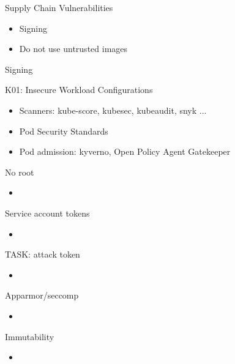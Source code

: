 \documentclass{dcpresentation}
\begin{document}
\begin{frame}{Supply Chain Vulnerabilities}
  \begin{itemize}
  \item Signing
  \item Do not use untrusted images
  \end{itemize}
  Signing

\end{frame}


\begin{frame}{K01: Insecure Workload Configurations}
  \begin{itemize}
  \item Scanners: kube-score, kubesec, kubeaudit, snyk ...
  \item Pod Security Standards
  \item Pod admission: kyverno, Open Policy Agent Gatekeeper
  \end{itemize}
\end{frame}


\begin{frame}{No root}
  \begin{itemize}
    \item 
  \end{itemize}
\end{frame}

\begin{frame}{Service account tokens}
  \begin{itemize}
    \item 
  \end{itemize}
\end{frame}

\begin{frame}{TASK: attack token}
  \begin{itemize}
    \item 
  \end{itemize}
\end{frame}

\begin{frame}{Apparmor/seccomp}
  \begin{itemize}
    \item 
  \end{itemize}
\end{frame}

\begin{frame}{Immutability}
  \begin{itemize}
    \item 
  \end{itemize}
\end{frame}
\end{document}
